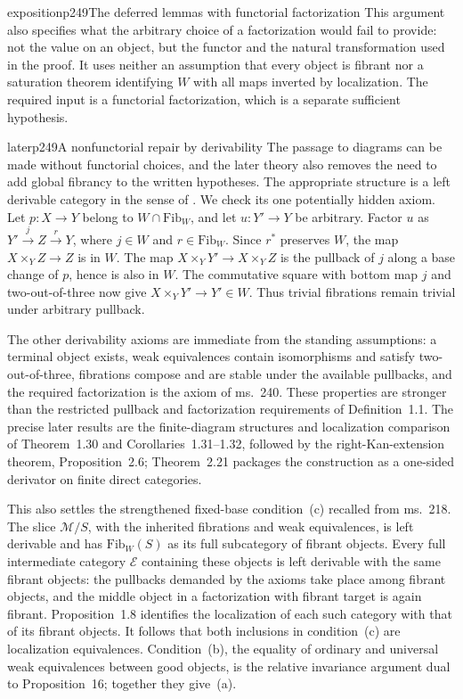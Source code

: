 \begin{dcomment}{exposition}{p249}{The deferred lemmas with functorial factorization}
This argument also specifies what the arbitrary choice of a factorization would fail to provide: not the value on an object, but the functor and the natural transformation used in the proof. It uses neither an assumption that every object is fibrant nor a saturation theorem identifying $W$ with all maps inverted by localization. The required input is a functorial factorization, which is a separate sufficient hypothesis.
\end{dcomment}


\begin{dcomment}{later}{p249}{A nonfunctorial repair by derivability}
The passage to diagrams can be made without functorial choices, and the later theory also removes the need to add global fibrancy to the written hypotheses. The appropriate structure is a left derivable category in the sense of \citet[Definition~1.1]{Cisinski2010}. We check its one potentially hidden axiom. Let $p:X\to Y$ belong to $W\cap\mathrm{Fib}_W$, and let $u:Y'\to Y$ be arbitrary. Factor $u$ as $Y'\xrightarrow{j}Z\xrightarrow{r}Y$, where $j\in W$ and $r\in\mathrm{Fib}_W$. Since $r^*$ preserves $W$, the map $X\times_Y Z\to Z$ is in $W$. The map $X\times_Y Y'\to X\times_Y Z$ is the pullback of $j$ along a base change of $p$, hence is also in $W$. The commutative square with bottom map $j$ and two-out-of-three now give $X\times_Y Y'\to Y'\in W$. Thus trivial fibrations remain trivial under arbitrary pullback.

The other derivability axioms are immediate from the standing assumptions: a terminal object exists, weak equivalences contain isomorphisms and satisfy two-out-of-three, fibrations compose and are stable under the available pullbacks, and the required factorization is the axiom of ms.~240. These properties are stronger than the restricted pullback and factorization requirements of Definition~1.1. The precise later results are the finite-diagram structures and localization comparison of Theorem~1.30 and Corollaries~1.31--1.32, followed by the right-Kan-extension theorem, Proposition~2.6; Theorem~2.21 packages the construction as a one-sided derivator on finite direct categories.

This also settles the strengthened fixed-base condition~(c) recalled from ms.~218. The slice $\mathcal M/S$, with the inherited fibrations and weak equivalences, is left derivable and has $\mathrm{Fib}_W(S)$ as its full subcategory of fibrant objects. Every full intermediate category $\mathcal E$ containing these objects is left derivable with the same fibrant objects: the pullbacks demanded by the axioms take place among fibrant objects, and the middle object in a factorization with fibrant target is again fibrant. Proposition~1.8 identifies the localization of each such category with that of its fibrant objects. It follows that both inclusions in condition~(c) are localization equivalences. Condition~(b), the equality of ordinary and universal weak equivalences between good objects, is the relative invariance argument dual to Proposition~16; together they give~(a).


\end{dcomment}

